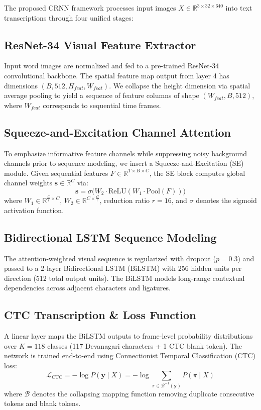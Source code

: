 \documentclass[runningheads]{llncs}
\begin{document}
The proposed CRNN framework processes input images $X \in \mathbb{R}^{3 \times 32 \times 640}$ into text transcriptions through four unified stages:

\subsection{ResNet-34 Visual Feature Extractor}
Input word images are normalized and fed to a pre-trained ResNet-34 convolutional backbone. The spatial feature map output from layer 4 has dimensions $(B, 512, H_{feat}, W_{feat})$. We collapse the height dimension via spatial average pooling to yield a sequence of feature columns of shape $(W_{feat}, B, 512)$, where $W_{feat}$ corresponds to sequential time frames.

\subsection{Squeeze-and-Excitation Channel Attention}
To emphasize informative feature channels while suppressing noisy background channels prior to sequence modeling, we insert a Squeeze-and-Excitation (SE) module. Given sequential features $F \in \mathbb{R}^{T \times B \times C}$, the SE block computes global channel weights $\mathbf{s} \in \mathbb{R}^{C}$ via:
\begin{equation}
\mathbf{s} = \sigma\Big(W_2 \cdot \text{ReLU}(W_1 \cdot \text{Pool}(F))\Big)
\end{equation}
where $W_1 \in \mathbb{R}^{\frac{C}{r} \times C}$, $W_2 \in \mathbb{R}^{C \times \frac{C}{r}}$, reduction ratio $r=16$, and $\sigma$ denotes the sigmoid activation function.

\subsection{Bidirectional LSTM Sequence Modeling}
The attention-weighted visual sequence is regularized with dropout ($p=0.3$) and passed to a 2-layer Bidirectional LSTM (BiLSTM) with 256 hidden units per direction (512 total output units). The BiLSTM models long-range contextual dependencies across adjacent characters and ligatures.

\subsection{CTC Transcription & Loss Function}
A linear layer maps the BiLSTM outputs to frame-level probability distributions over $K=118$ classes (117 Devanagari characters + 1 CTC blank token). The network is trained end-to-end using Connectionist Temporal Classification (CTC) loss:
\begin{equation}
\mathcal{L}_{\text{CTC}} = -\log P(\mathbf{y} \mid X) = -\log \sum_{\pi \in \mathcal{B}^{-1}(\mathbf{y})} P(\pi \mid X)
\end{equation}
where $\mathcal{B}$ denotes the collapsing mapping function removing duplicate consecutive tokens and blank tokens.
\end{document}
